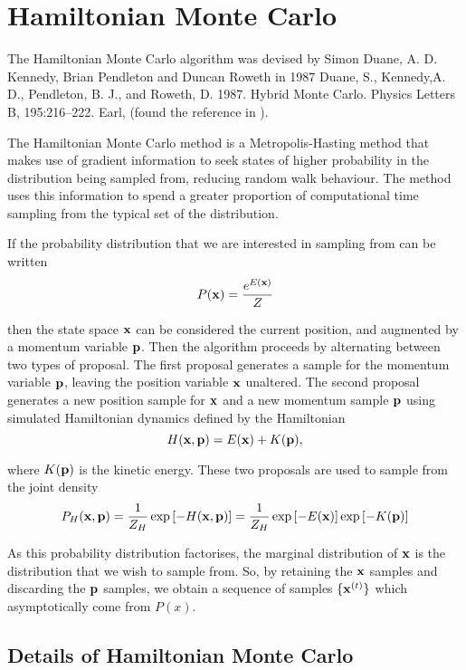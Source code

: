 \documentclass{amsart}[12pt]
\begin{document}
\section{Hamiltonian Monte Carlo}


The Hamiltonian Monte Carlo algorithm was devised by Simon Duane, A. D. Kennedy, Brian Pendleton and Duncan
Roweth in 1987 
Duane, S., Kennedy,A. D., Pendleton, B. J., and Roweth, D. 1987. Hybrid Monte Carlo. Physics Letters B, 195:216–222.
Earl,
(found the reference in \cite{Neal2011}).

The Hamiltonian Monte Carlo method is a Metropolis-Hasting method that makes use of gradient information to
seek states of higher probability in the distribution being sampled from, reducing random walk behaviour. The method uses this information to spend a greater proportion of computational time sampling from the typical set of 
the distribution.

If the probability distribution that we are interested in sampling from can be written
\[
	P({\bf x}) = \frac{e^{E({\bf x})}}{Z}
\]

then the state space ${\bf x}$ can be considered the current position, and augmented by a momentum variable
${\bf p}$. Then the algorithm proceeds by alternating between two types of proposal. The first proposal generates
a sample for the momentum variable ${\bf p}$, leaving the position variable ${\bf x}$ unaltered. The second proposal
generates a new position sample for ${\bf x}$ and a new momentum sample ${\bf p}$ using simulated Hamiltonian dynamics
defined by the Hamiltonian
\[
	H({\bf x}, {\bf p}) = E({\bf x}) + K({\bf p}),
\]

where $K({\bf p})$ is the kinetic energy. These two proposals are used to sample from the joint density
\[
	P_H({\bf x}, {\bf p}) = \frac{1}{Z_H} \exp{[-H({\bf x}, {\bf p})]} = \frac{1}{Z_H} \exp{[-E({\bf x})]} \exp{[ -K({\bf p})]}
\]

As this probability distribution factorises, the marginal distribution of ${\bf x}$ is the distribution that we
wish to sample from. So, by retaining the ${\bf x}$ samples and discarding the ${\bf p}$ samples, we obtain a sequence
of samples $\{ {\bf x}^{(t)} \}$ which asymptotically come from $P(x)$.

\subsection{Details of Hamiltonian Monte Carlo}
\end{document}

